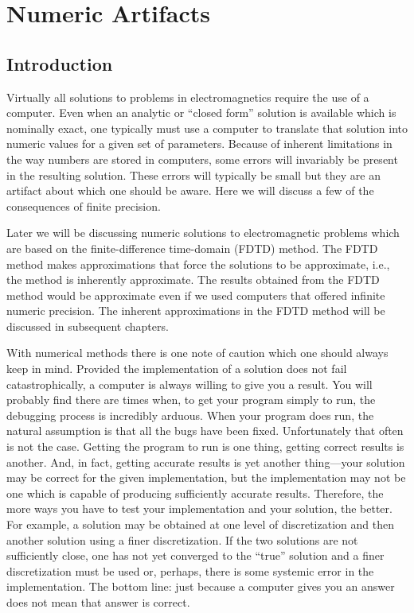 \chapter{Numeric Artifacts}


\renewcommand{\thefootnote}{\fnsymbol{footnote}}

\section{Introduction}

Virtually all solutions to problems in electromagnetics require the
use of a computer.  Even when an analytic or ``closed form'' solution
is available which is nominally exact, one typically must use a
computer to translate that solution into numeric values for a given
set of parameters.  Because of inherent limitations in the way numbers
are stored in computers, some errors will invariably be present in the
resulting solution.  These errors will typically be small but they are
an artifact about which one should be aware.  Here we will discuss
a few of the consequences of finite precision.

Later we will be discussing numeric solutions to electromagnetic
problems which are based on the finite-difference time-domain
(FDTD) method.  The FDTD method makes approximations that force
the solutions to be approximate, i.e., the method is inherently
approximate.  The results obtained from the FDTD method would be
approximate even if we used computers that offered infinite numeric
precision.  The inherent approximations in the FDTD method will be
discussed in subsequent chapters.

With numerical methods there is one note of caution which one should
always keep in mind.  Provided the implementation of a solution does
not fail catastrophically, a computer is always willing to give you a
result.  You will probably find there are times when, to get your
program simply to run, the debugging process is incredibly arduous.
When your program does run, the natural assumption is that all the
bugs have been fixed.  Unfortunately that often is not the case.
Getting the program to run is one thing, getting correct results is
another.  And, in fact, getting accurate results is yet another
thing---your solution may be correct for the given implementation, but
the implementation may not be one which is capable of producing
sufficiently accurate results.  Therefore, the more ways you have to
test your implementation and your solution, the better.  For example,
a solution may be obtained at one level of discretization and then
another solution using a finer discretization.  If the two solutions
are not sufficiently close, one has not yet converged to the ``true''
solution and a finer discretization must be used or, perhaps, there is
some systemic error in the implementation.  The bottom line: just
because a computer gives you an answer does not mean that answer is
correct.


